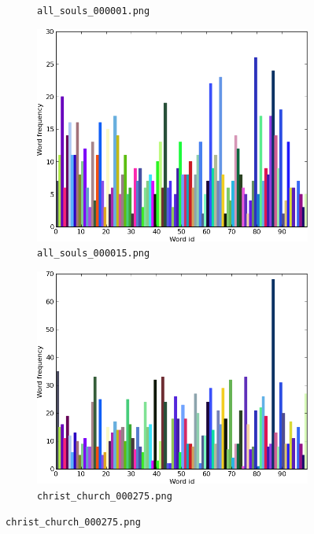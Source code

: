\documentclass[a4paper,10pt]{article}
\begin{document}
\begin{figure}
\begin{subfigure}{0.49\textwidth}
    \caption{\texttt{all\_souls\_000001.png}}
  \end{subfigure}
  \begin{subfigure}{0.49\textwidth}
    \centering
    \includegraphics[width=\textwidth,height=.3\textheight,keepaspectratio]{histogram3}
    \caption{\texttt{all\_souls\_000015.png}}
  \end{subfigure}
  \begin{subfigure}{0.49\textwidth}
    \centering
    \includegraphics[width=\textwidth,height=.3\textheight,keepaspectratio]{histogram4}
    \caption{\texttt{christ\_church\_000275.png}}
  \end{subfigure}

\end{figure}
\end{document}
